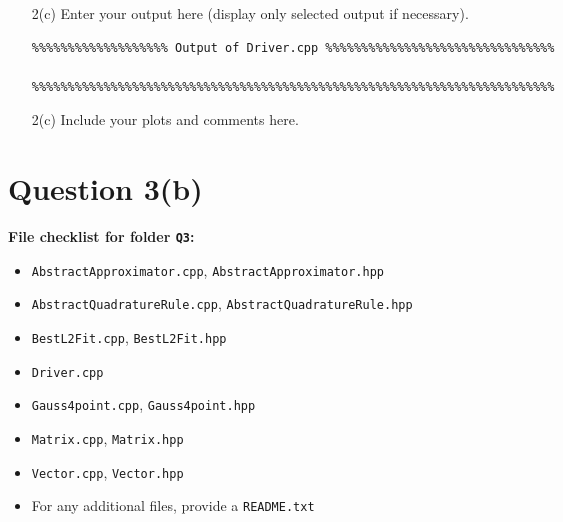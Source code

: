 \documentclass[a4,10pt,fleqn]{article}  %
\newcommand{\il}[1]{\texttt{#1}}
\begin{document}
\vspace{\baselineskip}
\begin{enumerate}

\item[2(c)] Enter your output here (display only selected output if necessary).

\begin{verbatim}
%%%%%%%%%%%%%%%%%%% Output of Driver.cpp %%%%%%%%%%%%%%%%%%%%%%%%%%%%%%%%

%%%%%%%%%%%%%%%%%%%%%%%%%%%%%%%%%%%%%%%%%%%%%%%%%%%%%%%%%%%%%%%%%%%%%%%%%
\end{verbatim}

\item[2(c)] Include your plots and comments here.

\end{enumerate}

\clearpage

\section*{Question 3(b)}

\textbf{File checklist for folder \il{Q3}:}
\begin{itemize}
 \item \il{AbstractApproximator.cpp}, \il{AbstractApproximator.hpp}
 \item \il{AbstractQuadratureRule.cpp}, \il{AbstractQuadratureRule.hpp}
 \item \il{BestL2Fit.cpp}, \il{BestL2Fit.hpp}
 \item \il{Driver.cpp}
 \item \il{Gauss4point.cpp}, \il{Gauss4point.hpp}
 \item \il{Matrix.cpp}, \il{Matrix.hpp}
 \item \il{Vector.cpp}, \il{Vector.hpp}
 \item For any additional files, provide a \il{README.txt}
\end{itemize}
\end{document}
